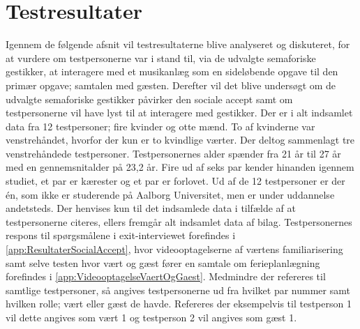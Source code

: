 \chapter{Testresultater}
\label{TestresultaterSocialAccept}
%
Igennem de følgende afsnit vil testresultaterne blive analyseret og diskuteret, for at vurdere om testpersonerne var i stand til, via de udvalgte semaforiske gestikker, at interagere med et musikanlæg som en sideløbende opgave til den primær opgave; samtalen med gæsten. Derefter vil det blive undersøgt om de udvalgte semaforiske gestikker påvirker den sociale accept samt om testpersonerne vil have lyst til at interagere med gestikker.\blankline
%
Der er i alt indsamlet data fra 12 testpersoner; fire kvinder og otte mænd. To af kvinderne var venstrehåndet, hvorfor der kun er to kvindlige værter. Der deltog sammenlagt tre venstrehåndede testpersoner. Testpersonernes alder spænder fra 21 år til 27 år med en gennemsnitalder på 23,2 år. Fire ud af seks par kender hinanden igennem studiet, et par er kærester og et par er forlovet. Ud af de 12 testpersoner er der én, som ikke er studerende på Aalborg Universitet, men er under uddannelse andetsteds. Der henvises kun til det indsamlede data i tilfælde af at testpersonerne citeres, ellers fremgår alt indsamlet data af bilag. Testpersonernes respons til spørgsmålene i exit-interviewet forefindes i \autoref{app:ResultaterSocialAccept}, hvor videooptagelserne af værtens familiarisering samt selve testen hvor vært og gæst fører en samtale om ferieplanlægning forefindes i \autoref{app:VideooptagelseVaertOgGaest}. Medmindre der refereres til samtlige testpersoner, så angives testpersonerne ud fra hvilket par nummer samt hvilken rolle; vært eller gæst de havde. Refereres der eksempelvis til testperson 1 vil dette angives som vært 1 og testperson 2 vil angives som gæst 1. 



